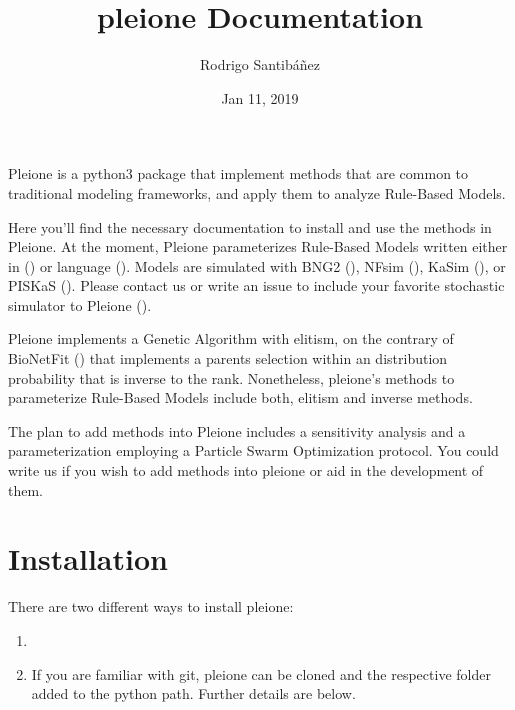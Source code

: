 \documentclass[letterpaper,10pt,english]{sphinxmanual}
\title{pleione Documentation}
\date{Jan 11, 2019}
\author{Rodrigo Santibáñez}
\begin{document}
\pagestyle{empty}
\maketitle
\pagestyle{plain}
\sphinxtableofcontents
\pagestyle{normal}
\label{\detokenize{index::doc}}


Pleione is a python3 package that implement methods that are common to
traditional modeling frameworks, and apply them to analyze Rule-Based Models.

Here you’ll find the necessary documentation to install and use the methods in
Pleione. At the moment, Pleione parameterizes Rule-Based Models written
either in  () or  language (). Models are
simulated with BNG2 (), NFsim (), KaSim (), or
PISKaS (). Please contact us or write an issue to include your
favorite stochastic simulator to Pleione ().

Pleione implements a Genetic Algorithm with elitism, on the
contrary of BioNetFit () that implements a parents selection within
an distribution probability that is inverse to the rank. Nonetheless, pleione’s
methods to parameterize Rule-Based Models include both, elitism and inverse methods.

The plan to add methods into Pleione includes a sensitivity analysis and a
parameterization employing a Particle Swarm Optimization protocol. You
could write us if you wish to add methods into pleione or aid in the development
of them.


\chapter{Installation}
\label{\detokenize{Installation:installation}}\label{\detokenize{Installation::doc}}
There are two different ways to install pleione:
\begin{enumerate}
\def\theenumi{\arabic{enumi}}
\def\labelenumi{\theenumi .}
\makeatletter\def\p@enumii{\p@enumi \theenumi .}\makeatother
\item {} 


\item {} 
 If you are familiar with git, pleione can
be cloned and the respective folder added to the python path. Further details
are below.

\end{enumerate}
\end{document}
